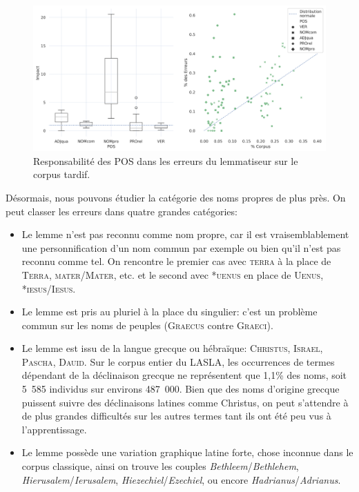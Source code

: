 \begin{figure}
    \centering
    \includegraphics[width=1\linewidth]{results/lemmatisation/extensibilite/LatinTardifPosErrorBoxPlot.png}
    \caption{Responsabilité des POS dans les erreurs du lemmatiseur sur le corpus tardif.}
    \label{fig:latin_tardif_error_pos}
\end{figure}

Désormais, nous pouvons étudier la catégorie des noms propres de plus près. On peut classer les erreurs dans quatre grandes catégories:
\begin{itemize}
    \item Le lemme n'est pas reconnu comme nom propre, car il est vraisemblablement une personnification d'un nom commun par exemple ou bien qu'il n'est pas reconnu comme tel. On rencontre le premier cas avec \textsc{terra} à la place de \textsc{Terra}, \textsc{mater}/\textsc{Mater}, etc. et le second avec *\textsc{uenus} en place de \textsc{Uenus}, *\textsc{iesus}/\textsc{Iesus}.
    \item Le lemme est pris au pluriel à la place du singulier: c'est un problème commun sur les noms de peuples (\textsc{Graecus} contre \textsc{Graeci}).
    \item Le lemme est issu de la langue grecque ou hébraïque: \textsc{Christus}, \textsc{Israel}, \textsc{Pascha}, \textsc{Dauid}. Sur le corpus entier du LASLA, les occurrences de termes dépendant de la déclinaison grecque ne représentent que 1,1\% des noms, soit 5~585 individus sur environs 487~000. Bien que des noms d'origine grecque puissent suivre des déclinaisons latines comme Christus, on peut s'attendre à de plus grandes difficultés sur les autres termes tant ils ont été peu vus à l'apprentissage.
    \item Le lemme possède une variation graphique latine forte, chose inconnue dans le corpus classique, ainsi on trouve les couples \textit{Bethleem}/\textit{Bethlehem}, \textit{Hierusalem}/\textit{Ierusalem}, \textit{Hiezechiel}/\textit{Ezechiel}, ou encore \textit{Hadrianus}/\textit{Adrianus}.
\end{itemize}

